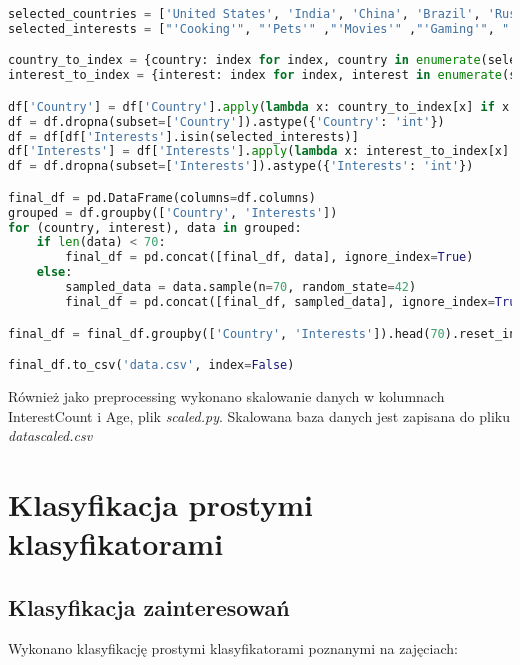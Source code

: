 \documentclass[12pt,a4paper]{article}
\begin{document}
\begin{lstlisting}[language=Python]
selected_countries = ['United States', 'India', 'China', 'Brazil', 'Russia', 'Germany', 'Japan', 'United Kingdom', 'France', 'Mexico']
selected_interests = ["'Cooking'", "'Pets'" ,"'Movies'" ,"'Gaming'", "'Fitness'" ,"'Outdoor activities'", "'Travel'", "'Business and entrepreneurship'" , "'Social causes and activism'"]

country_to_index = {country: index for index, country in enumerate(selected_countries)}
interest_to_index = {interest: index for index, interest in enumerate(selected_interests)}

df['Country'] = df['Country'].apply(lambda x: country_to_index[x] if x in selected_countries else None)
df = df.dropna(subset=['Country']).astype({'Country': 'int'})
df = df[df['Interests'].isin(selected_interests)]
df['Interests'] = df['Interests'].apply(lambda x: interest_to_index[x] if x in selected_interests else None)
df = df.dropna(subset=['Interests']).astype({'Interests': 'int'})

final_df = pd.DataFrame(columns=df.columns)
grouped = df.groupby(['Country', 'Interests'])
for (country, interest), data in grouped:
    if len(data) < 70:
        final_df = pd.concat([final_df, data], ignore_index=True)
    else:
        sampled_data = data.sample(n=70, random_state=42)
        final_df = pd.concat([final_df, sampled_data], ignore_index=True)

final_df = final_df.groupby(['Country', 'Interests']).head(70).reset_index(drop=True)

final_df.to_csv('data.csv', index=False)
\end{lstlisting}
Również jako preprocessing wykonano skalowanie danych w kolumnach InterestCount i Age, plik \textit{scaled.py}. Skalowana baza danych jest zapisana do pliku \textit{data\textunderscore scaled.csv}

\newpage

\section{Klasyfikacja prostymi klasyfikatorami}

\subsection{Klasyfikacja zainteresowań}

Wykonano klasyfikację prostymi klasyfikatorami poznanymi na zajęciach: 
\end{document}

